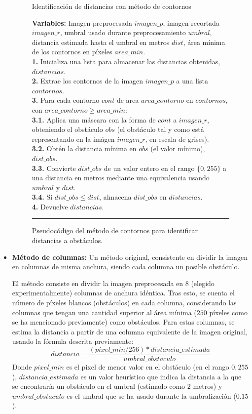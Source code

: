 \begin{itemize}
\begin{figure}[h]
\begin{algorithm}[H]
\caption{Identificación de distancias con método de contornos}
\textbf{Variables:} Imagen preprocesada $imagen\_p$, imagen recortada $imagen\_r$, umbral usado durante preprocesamiento $umbral$, distancia estimada hasta el umbral en metros $dist$, área mínima de los contornos en píxeles $area\_min$.\\
\textbf{1.} Inicializa una lista para almacenar las distancias obtenidas, $distancias$.\\
\textbf{2.} Extrae los contornos de la imagen $imagen\_p$ a una lista $contornos$.\\
\textbf{3.} Para cada contorno $cont$ de area $area\_contorno$ en $contornos$, con $area\_contorno \geq area\_min$:\\
\Indp \textbf{3.1.} Aplica una máscara con la forma de $cont$ a $imagen\_r$, obteniendo el obstáculo $obs$ (el obstáculo tal y como está representando en la imágen $imagen\_r$, en escala de grises).\\
\textbf{3.2.} Obtén la distancia mínima en $obs$ (el valor mínimo), $dist\_obs$.\\
\textbf{3.3.} Convierte $dist\_obs$ de un valor entero en el rango $\{0, 255\}$ a una distancia en metros mediante una equivalencia usando $umbral$ y $dist$.\\
\textbf{3.4.} Si $dist\_obs \leq dist$, almacena $dist\_obs$ en $distancias$.\\
\Indm \textbf{4.} Devuelve $distancias$.
\end{algorithm}
\hrule
\caption{Pseudocódigo del método de contornos para identificar distancias a obstáculos.}
\label{alg:contour}
\end{figure}

\newpage 

	\item \textbf{Método de columnas:} Un método original, consistente en dividir la imagen  en columnas de misma anchura, siendo cada columna un posible obstáculo. 
	
	El método consiste en dividir la imagen preprocesada en $8$ (elegido experimentalmente) columnas de anchura idéntica. Tras esto, se cuenta el número de píxeles blancos (obstáculos) en cada columna, considerando las columnas que tengan una cantidad superior al área mínima ($250$ píxeles como se ha mencionado previamente) como obstáculos. Para estas columnas, se estima la distancia a partir de una columna equivalente de la imagen original, usando la fórmula descrita previamente:
	\[distancia = \frac{(pixel\_min / 256) * distancia\_estimada}{umbral\_obstaculo}\]
Donde $pixel\_min$ es el pixel de menor valor en el obstáculo (en el rango ${0, 255}$), $distancia\_estimada$ es un valor heurístico que indica la distancia a la que se encontraría un obstáculo en el umbral (estimado como $2$ metros) y $umbral\_obstaculo$ es el umbral que se ha usado durante la umbralización ($0.15$).


\end{itemize}

